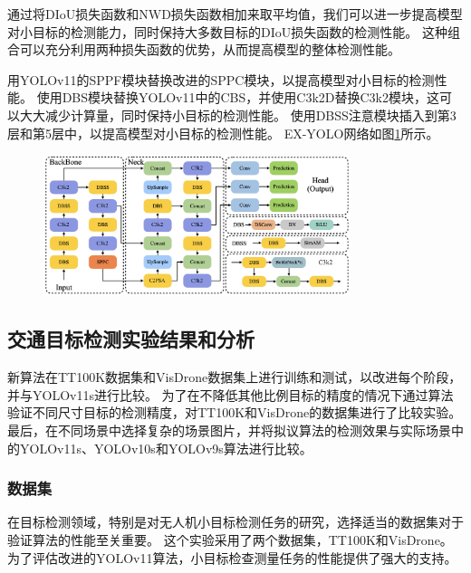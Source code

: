 通过将DIoU损失函数和NWD损失函数相加来取平均值，我们可以进一步提高模型对小目标的检测能力，同时保持大多数目标的DIoU损失函数的检测性能。
这种组合可以充分利用两种损失函数的优势，从而提高模型的整体检测性能。


用YOLOv11的SPPF模块替换改进的SPPC模块，以提高模型对小目标的检测性能。
使用DBS模块替换YOLOv11中的CBS，并使用C3k2D替换C3k2模块，这可以大大减少计算量，同时保持小目标的检测性能。
使用DBSS注意模块插入到第3层和第5层中，以提高模型对小目标的检测性能。 EX-YOLO网络如图\ref{fig:ex_yolo_detail}所示。

\begin{figure}[htbp]
    \centering
    \includegraphics[width=0.8\textwidth]{../figure/ex_yolo_detail.png}
    \captionsetup{font=footnotesize}
    \label{fig:ex_yolo_detail}
\end{figure}


\subsection{交通目标检测实验结果和分析}

新算法在TT100K数据集\cite{tt100k}和VisDrone数据集\cite{vd}上进行训练和测试，以改进每个阶段，并与YOLOv11s\cite{yolov11}进行比较。
为了在不降低其他比例目标的精度的情况下通过算法验证不同尺寸目标的检测精度，对TT100K和VisDrone的数据集进行了比较实验。
最后，在不同场景中选择复杂的场景图片，并将拟议算法的检测效果与实际场景中的YOLOv11s、YOLOv10s\cite{yolov10}和YOLOv9s\cite{yolov9}算法进行比较。

\subsubsection{数据集}

在目标检测领域，特别是对无人机小目标检测任务的研究，选择适当的数据集对于验证算法的性能至关重要。
这个实验采用了两个数据集，TT100K和VisDrone。
为了评估改进的YOLOv11算法，小目标检查测量任务的性能提供了强大的支持。

